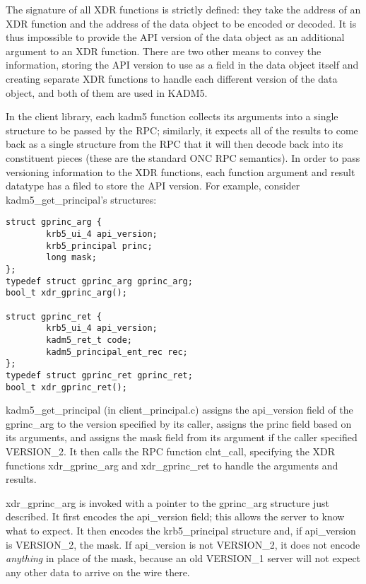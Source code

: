 The signature of all XDR functions is strictly defined: they take the
address of an XDR function and the address of the data object to be
encoded or decoded.  It is thus impossible to provide the API version
of the data object as an additional argument to an XDR function.
There are two other means to convey the information, storing the API
version to use as a field in the data object itself and creating
separate XDR functions to handle each different version of the data
object, and both of them are used in KADM5.

In the client library, each kadm5 function collects its arguments into
a single structure to be passed by the RPC; similarly, it expects all
of the results to come back as a single structure from the RPC that it
will then decode back into its constituent pieces (these are the
standard ONC RPC semantics).  In order to pass versioning information
to the XDR functions, each function argument and result datatype has a
filed to store the API version.  For example, consider
kadm5_get_principal's structures:
%
\begin{verbatim}
struct gprinc_arg {
        krb5_ui_4 api_version;
        krb5_principal princ;
        long mask;
};
typedef struct gprinc_arg gprinc_arg;
bool_t xdr_gprinc_arg();

struct gprinc_ret {
        krb5_ui_4 api_version;
        kadm5_ret_t code;
        kadm5_principal_ent_rec rec;
};
typedef struct gprinc_ret gprinc_ret;
bool_t xdr_gprinc_ret();
\end{verbatim}
%
kadm5_get_principal (in client_principal.c) assigns the api_version
field of the gprinc_arg to the version specified by its caller,
assigns the princ field based on its arguments, and assigns the mask
field from its argument if the caller specified VERSION_2.  It then
calls the RPC function clnt_call, specifying the XDR functions
xdr_gprinc_arg and xdr_gprinc_ret to handle the arguments and results.

xdr_gprinc_arg is invoked with a pointer to the gprinc_arg structure
just described.  It first encodes the api_version field; this allows
the server to know what to expect.  It then encodes the krb5_principal
structure and, if api_version is VERSION_2, the mask.  If api_version
is not VERSION_2, it does not encode {\it anything} in place of the
mask, because an old VERSION_1 server will not expect any other data
to arrive on the wire there.

